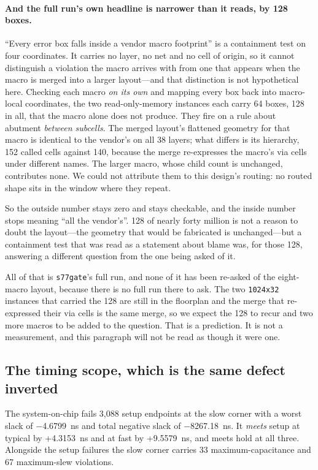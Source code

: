 \documentclass[11pt,a4paper]{article}
\begin{document}
\paragraph{And the full run's own headline is narrower than it reads,
by \num{128} boxes.} ``Every error box falls inside a vendor macro
footprint'' is a containment test on four coordinates. It carries no
layer, no net and no cell of origin, so it cannot distinguish a
violation the macro arrives with from one that appears when the macro is
merged into a larger layout---and that distinction is not hypothetical
here. Checking each macro \emph{on its own} and mapping every box back
into macro-local coordinates, the two read-only-memory instances each
carry \num{64} boxes, \num{128} in all, that the macro alone does not
produce. They fire on a rule about abutment \emph{between subcells}.
The merged layout's flattened geometry for that macro is identical to
the vendor's on all 38 layers; what differs is its hierarchy, 152 called
cells against 140, because the merge re-expresses the macro's via cells
under different names. The larger macro, whose child count is unchanged,
contributes none. We could not attribute them to this design's routing:
no routed shape sits in the window where they repeat.

So the outside number stays zero and stays checkable, and the inside
number stops meaning ``all the vendor's''. \num{128} of nearly forty
million is not a reason to doubt the layout---the geometry that would be
fabricated is unchanged---but a containment test that was read as a
statement about blame was, for those \num{128}, answering a different
question from the one being asked of it.

All of that is \texttt{s77gate}'s full run, and none of it has been
re-asked of the eight-macro layout, because there is no full run there
to ask. The two \texttt{1024x32} instances that carried the \num{128}
are still in the floorplan and the merge that re-expressed their via
cells is the same merge, so we expect the \num{128} to recur and two
more macros to be added to the question. That is a prediction. It is not
a measurement, and this paragraph will not be read as though it were
one.

\subsection{The timing scope, which is the same defect inverted}

The system-on-chip fails 3{,}088 setup endpoints at the slow corner with
a worst slack of $-$\SI{4.6799}{\nano\second} and total negative slack of
$-$\SI{8267.18}{\nano\second}. It \emph{meets} setup at typical by
+\SI{4.3153}{\nano\second} and at fast by +\SI{9.5579}{\nano\second}, and
meets hold at all three. Alongside the setup failures the slow corner
carries 33 maximum-capacitance and 67 maximum-slew violations.
\end{document}
